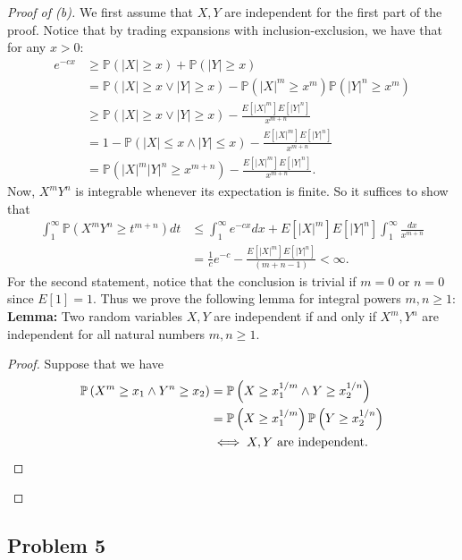 \documentclass[12pt,reqno]{article}
\theoremstyle{plain}
\theoremstyle{definition}
\newcommand{\PP}[1]{\ensuremath{\mathbb{P}\left(#1\right)}}
\begin{document}
\begin{proof}[Proof of (b)] 
We first assume that $X,Y$ are independent for the first part of the proof. 
Notice that by trading expansions with inclusion-exclusion, we have that 
for any $x > 0$:
\begin{align*} 
e^{-cx} & \geq \PP{|X| \geq x} + \PP{|Y| \geq x} \\ 
     & = \PP{|X| \geq x \vee |Y| \geq x} - 
     \PP{|X|^m \geq x^m} \PP{|Y|^n \geq x^m} \\ 
     & \geq \PP{|X| \geq x \vee |Y| \geq x} - 
     \frac{E[|X|^m] E[|Y|^n]}{x^{m+n}} \\ 
     & = 1 - \PP{|X| \leq x \wedge |Y| \leq x} - 
     \frac{E[|X|^m] E[|Y|^n]}{x^{m+n}} \\ 
     & = \PP{|X|^m |Y|^n \geq x^{m+n}} - 
     \frac{E[|X|^m] E[|Y|^n]}{x^{m+n}}. 
\end{align*} 
Now, $X^mY^n$ is integrable whenever its expectation is finite. So it 
suffices to show that 
\begin{align*} 
\int_1^{\infty} \PP{X^mY^n \geq t^{m+n}} dt & \leq 
     \int_1^{\infty} e^{-cx} dx 
     + E[|X|^m] E[|Y|^n] \int_1^{\infty} \frac{dx}{x^{m+n}} \\ 
     & = \frac{1}{c} e^{-c} - \frac{E[|X|^m] E[|Y|^n]}{(m+n-1)} < \infty. 
\end{align*} 
For the second statement, notice that the conclusion is trivial if 
$m=0$ or $n = 0$ since $E[1] = 1$. Thus we prove the following lemma 
for integral powers $m,n \geq 1$: \\ 
\noindent 
\textbf{Lemma:} 
Two random variables $X,Y$ are independent if and only if $X^m,Y^n$ are 
independent for all natural numbers $m,n \geq 1$. 
\begin{proof} 
Suppose that we have 
\begin{align*} 
\PP{X^m \geq x_1 \wedge Y^n \geq x_2} & = 
     \PP{X \geq x_1^{1/m} \wedge Y \geq x_2^{1/n}} \\ 
     & = \PP{X \geq x_1^{1/m}} \PP{Y \geq x_2^{1/n}} \\ 
     & \iff X,Y \text{ are independent. } 
     \qedhere
\end{align*} 
\end{proof} 
\end{proof} 

\subsection{Problem 5}
\end{document}
